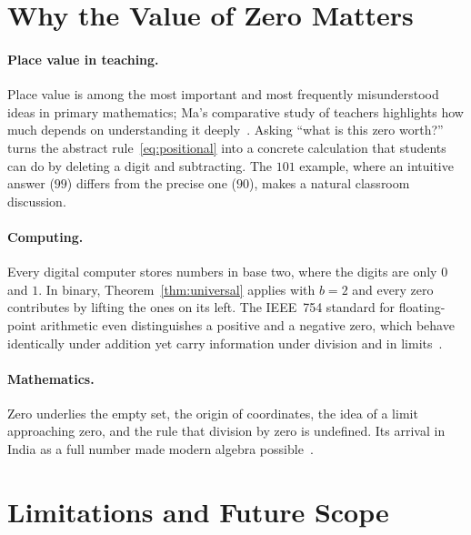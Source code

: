 \documentclass[11pt,a4paper]{article}
\theoremstyle{definition}
\begin{document}
\section{Why the Value of Zero Matters}\label{sec:importance}

\paragraph{Place value in teaching.} Place value is among the most important and most frequently misunderstood ideas in primary mathematics; Ma's comparative study of teachers highlights how much depends on understanding it deeply~\cite{ma}. Asking ``what is this zero worth?'' turns the abstract rule~\eqref{eq:positional} into a concrete calculation that students can do by deleting a digit and subtracting. The $101$ example, where an intuitive answer ($99$) differs from the precise one ($90$), makes a natural classroom discussion.

\paragraph{Computing.} Every digital computer stores numbers in base two, where the digits are only $0$ and $1$. In binary, Theorem~\ref{thm:universal} applies with $b=2$ and every zero contributes by lifting the ones on its left. The IEEE~754 standard for floating-point arithmetic even distinguishes a positive and a negative zero, which behave identically under addition yet carry information under division and in limits~\cite{ieee754}.

\paragraph{Mathematics.} Zero underlies the empty set, the origin of coordinates, the idea of a limit approaching zero, and the rule that division by zero is undefined. Its arrival in India as a full number made modern algebra possible~\cite{kaplan,plofker}.

\section{Limitations and Future Scope}\label{sec:future}
\end{document}
